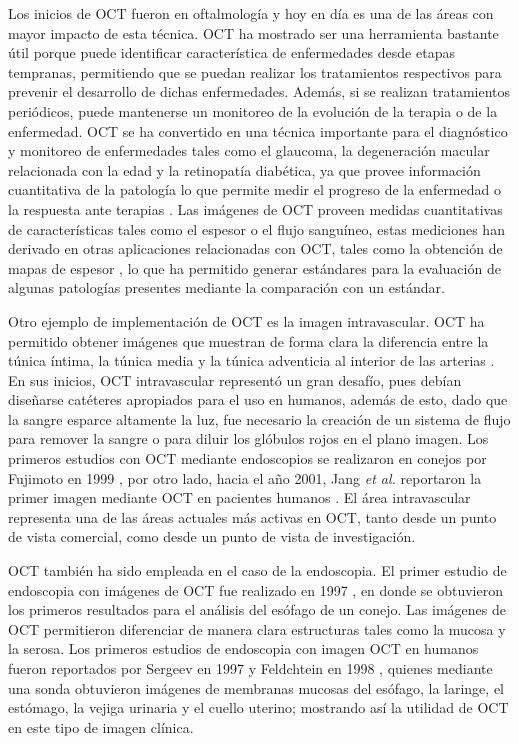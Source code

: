 Los inicios de OCT fueron en oftalmología y hoy en día es una de las áreas con mayor impacto de esta técnica. OCT ha mostrado ser una herramienta bastante útil porque puede identificar característica de enfermedades desde etapas tempranas, permitiendo que se puedan realizar los tratamientos respectivos para prevenir el desarrollo de dichas enfermedades. Además, si se realizan tratamientos periódicos, puede mantenerse un monitoreo de la evolución de la terapia o de la enfermedad. OCT se ha convertido en una técnica importante para el diagnóstico y monitoreo de enfermedades tales como el glaucoma, la degeneración macular relacionada con la edad y la retinopatía diabética, ya que provee información cuantitativa de la patología lo que permite medir el progreso de la enfermedad o la respuesta ante terapias \cite{Hee1998, Schuman1995,Schuman1996}. Las imágenes de OCT proveen medidas cuantitativas de características tales como el espesor o el flujo sanguíneo, estas mediciones han derivado en otras aplicaciones relacionadas con OCT, tales como la obtención de mapas de espesor \cite{Hee1998}, lo que ha permitido generar estándares para la evaluación de algunas patologías presentes mediante la comparación con un estándar.

Otro ejemplo de implementación de OCT es la imagen intravascular. OCT ha permitido obtener imágenes que muestran de forma clara la diferencia entre la túnica íntima, la túnica media y la túnica adventicia al interior de las arterias \cite{Tearney1996_2}. En sus inicios, OCT intravascular \invivo representó un gran desafío, pues debían diseñarse catéteres apropiados para el uso en humanos, además de esto, dado que la sangre esparce altamente la luz, fue necesario la creación de un sistema de flujo para remover la sangre o para diluir los glóbulos rojos en el plano imagen. Los primeros estudios con OCT mediante endoscopios se realizaron en conejos por Fujimoto \etal en 1999 \cite{Fujimoto1999}, por otro lado, hacia el año 2001, Jang \emph{et al.} reportaron la primer imagen mediante OCT en pacientes humanos \cite{Jang2001}. El área intravascular representa una de las áreas actuales más activas en OCT, tanto desde un punto de vista comercial, como desde un punto de vista de investigación.

OCT también ha sido empleada en el caso de la endoscopia. El primer estudio de endoscopia \invivo con imágenes de OCT fue realizado en 1997 \cite{Tearney1997, Sergeev1997}, en donde se obtuvieron los primeros resultados para el análisis del esófago de un conejo. Las imágenes de OCT permitieron diferenciar de manera clara estructuras tales como la mucosa y la serosa. Los primeros estudios de endoscopia con imagen OCT en humanos fueron reportados por Sergeev \etal en 1997 \cite{Sergeev1997} y Feldchtein \etal en 1998 \cite{Feldchtein1998}, quienes mediante una sonda obtuvieron imágenes de membranas mucosas del esófago, la laringe, el estómago, la vejiga urinaria y el cuello uterino; mostrando así la utilidad de OCT en este tipo de imagen clínica.

